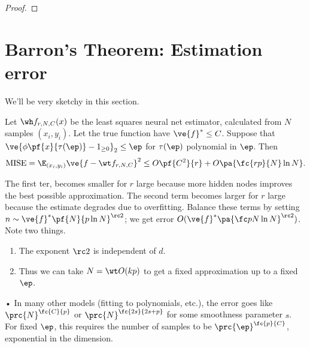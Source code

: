 \begin{proof}
\end{proof}

\section{Barron's Theorem: Estimation error}
We'll be very sketchy in this section.
\begin{thm}
Let $\wh f_{r,N,C}(x)$ be the least squares neural net estimator, calculated from $N$ samples $(x_i,y_i)$. Let the true function have $\ve{f}^*\le C$. 
Suppose that $\ve{\phi\pf{x}{\tau(\ep)}-1_{\ge0}}_{2}\le \ep$ for $\tau(\ep)$ polynomial in $\ep$. Then
\[
\text{MISE} =\E_{(x_i,y_i)} \ve{f-\wt f_{r,N,C}}^2 \le O\pf{C^2}{r} + O\pa{\fc{rp}{N}\ln N}.
\]
\end{thm}
The first ter, becomes smaller for $r$ large because more hidden nodes improves the best possible approximation. The second term becomes larger for $r$ large because the estimate degrades due to overfitting. Balance these terms by setting $n\sim \ve{f}^* \pf{N}{p\ln N}^{\rc 2}$; we get error $O(\ve{f}^*\pa{\fc p N \ln N}^{\rc 2})$. Note two things.
\begin{enumerate}
\item
The exponent $\rc2$ is independent of $d$.
\item Thus we can take $N=\wt O(kp)$ to get a fixed  approximation up to a fixed $\ep$.
\end{enumerate}•
In many other models (fitting to polynomials, etc.), the error goes like $\prc{N}^{\fc{C}{p}}$ or $\prc{N}^{\fc{2s}{2s+p}}$ for some smoothness parameter $s$. For fixed $\ep$, this requires the number of samples to be $\prc{\ep}^{\fc{p}{C}}$, exponential in the dimension.

